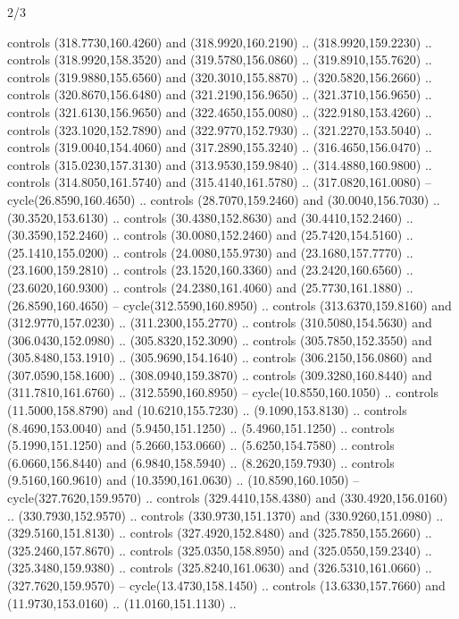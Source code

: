 \begin{flagdescription}{2/3}
\begin{scope}[xshift=0.5\flaglength,yshift=0.5\flagwidth,scale=\stretchfactor]
\begin{scope}[scale=0.001645\flagwidth,yshift=65mm,xshift=-63mm]
\begin{scope}[y=0.80pt, x=0.80pt, yscale=-1,]
\begin{scope}[cm={{1.33333,0.0,0.0,1.33333,(0.0,1e-05)}}]
  controls (318.7730,160.4260) and (318.9920,160.2190) .. (318.9920,159.2230) ..
  controls (318.9920,158.3520) and (319.5780,156.0860) .. (319.8910,155.7620) ..
  controls (319.9880,155.6560) and (320.3010,155.8870) .. (320.5820,156.2660) ..
  controls (320.8670,156.6480) and (321.2190,156.9650) .. (321.3710,156.9650) ..
  controls (321.6130,156.9650) and (322.4650,155.0080) .. (322.9180,153.4260) ..
  controls (323.1020,152.7890) and (322.9770,152.7930) .. (321.2270,153.5040) ..
  controls (319.0040,154.4060) and (317.2890,155.3240) .. (316.4650,156.0470) ..
  controls (315.0230,157.3130) and (313.9530,159.9840) .. (314.4880,160.9800) ..
  controls (314.8050,161.5740) and (315.4140,161.5780) .. (317.0820,161.0080) --
  cycle(26.8590,160.4650) .. controls (28.7070,159.2460) and (30.0040,156.7030)
  .. (30.3520,153.6130) .. controls (30.4380,152.8630) and (30.4410,152.2460) ..
  (30.3590,152.2460) .. controls (30.0080,152.2460) and (25.7420,154.5160) ..
  (25.1410,155.0200) .. controls (24.0080,155.9730) and (23.1680,157.7770) ..
  (23.1600,159.2810) .. controls (23.1520,160.3360) and (23.2420,160.6560) ..
  (23.6020,160.9300) .. controls (24.2380,161.4060) and (25.7730,161.1880) ..
  (26.8590,160.4650) -- cycle(312.5590,160.8950) .. controls (313.6370,159.8160)
  and (312.9770,157.0230) .. (311.2300,155.2770) .. controls (310.5080,154.5630)
  and (306.0430,152.0980) .. (305.8320,152.3090) .. controls (305.7850,152.3550)
  and (305.8480,153.1910) .. (305.9690,154.1640) .. controls (306.2150,156.0860)
  and (307.0590,158.1600) .. (308.0940,159.3870) .. controls (309.3280,160.8440)
  and (311.7810,161.6760) .. (312.5590,160.8950) -- cycle(10.8550,160.1050) ..
  controls (11.5000,158.8790) and (10.6210,155.7230) .. (9.1090,153.8130) ..
  controls (8.4690,153.0040) and (5.9450,151.1250) .. (5.4960,151.1250) ..
  controls (5.1990,151.1250) and (5.2660,153.0660) .. (5.6250,154.7580) ..
  controls (6.0660,156.8440) and (6.9840,158.5940) .. (8.2620,159.7930) ..
  controls (9.5160,160.9610) and (10.3590,161.0630) .. (10.8590,160.1050) --
  cycle(327.7620,159.9570) .. controls (329.4410,158.4380) and
  (330.4920,156.0160) .. (330.7930,152.9570) .. controls (330.9730,151.1370) and
  (330.9260,151.0980) .. (329.5160,151.8130) .. controls (327.4920,152.8480) and
  (325.7850,155.2660) .. (325.2460,157.8670) .. controls (325.0350,158.8950) and
  (325.0550,159.2340) .. (325.3480,159.9380) .. controls (325.8240,161.0630) and
  (326.5310,161.0660) .. (327.7620,159.9570) -- cycle(13.4730,158.1450) ..
  controls (13.6330,157.7660) and (11.9730,153.0160) .. (11.0160,151.1130) ..

\end{scope}
\end{scope}
\end{scope}
\end{scope}
\end{flagdescription}
